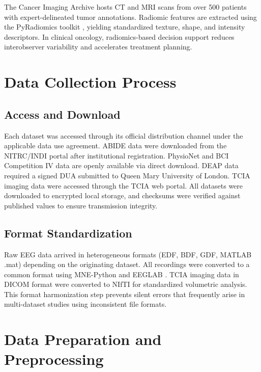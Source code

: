 The Cancer Imaging Archive \citep{clark2014tcia} hosts CT and MRI scans from over 500 patients with expert-delineated tumor annotations. Radiomic features are extracted using the PyRadiomics toolkit \citep{vanGriethuysen2017pyradiomics}, yielding standardized texture, shape, and intensity descriptors. In clinical oncology, radiomics-based decision support reduces interobserver variability and accelerates treatment planning.

\section{Data Collection Process}
\label{sec:data_collection}

\subsection{Access and Download}

Each dataset was accessed through its official distribution channel under the applicable data use agreement. ABIDE data were downloaded from the NITRC/INDI portal after institutional registration. PhysioNet and BCI Competition IV data are openly available via direct download. DEAP data required a signed DUA submitted to Queen Mary University of London. TCIA imaging data were accessed through the TCIA web portal. All datasets were downloaded to encrypted local storage, and checksums were verified against published values to ensure transmission integrity.

\subsection{Format Standardization}

Raw EEG data arrived in heterogeneous formats (EDF, BDF, GDF, MATLAB .mat) depending on the originating dataset. All recordings were converted to a common format using MNE-Python and EEGLAB \citep{delorme2004eeglab}. TCIA imaging data in DICOM format were converted to NIfTI for standardized volumetric analysis. This format harmonization step prevents silent errors that frequently arise in multi-dataset studies using inconsistent file formats.

\section{Data Preparation and Preprocessing}
\label{sec:data_prep}

